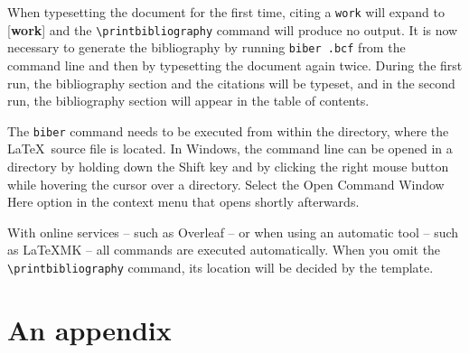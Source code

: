 \documentclass[
  digital,     %
  oneside,     %
  nosansbold,  %
  nocolorbold, %
  lof,         %
  lot,         %
]{fithesis4}
\begin{document}
When typesetting the document for the first time, citing a
\texttt{work} will expand to [\textbf{work}] and the
\verb"\printbibliography" command will produce no output. It is now
necessary to generate the bibliography by running \texttt{biber
\jobname.bcf} from the command line and then by typesetting the
document again twice. During the first run, the bibliography
section and the citations will be typeset, and in the second run,
the bibliography section will appear in the table of contents.

The \texttt{biber} command needs to be executed from within the
directory, where the \LaTeX\ source file is located. In Windows,
the command line can be opened in a directory by holding down the
\textsf{Shift} key and by clicking the right mouse button while
hovering the cursor over a directory.  Select the \textsf{Open
Command Window Here} option in the context menu that opens shortly
afterwards.

With online services -- such as Overleaf -- or when using an
automatic tool -- such as \LaTeX MK -- all commands are executed
automatically. When you omit the \verb"\printbibliography" command,
its location will be decided by the template.

  \printbibliography[heading=bibintoc] %


\appendix %
\chapter{An appendix}
\end{document}
